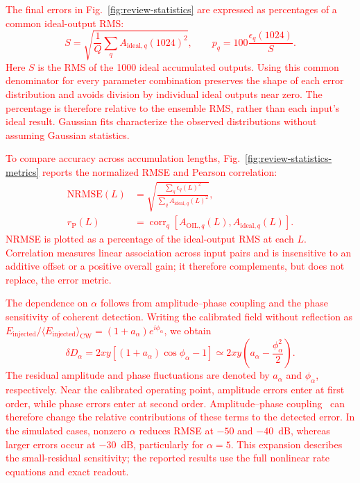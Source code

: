 \documentclass[
 aip,
 apl,
 amsmath,amssymb,
 preprint,
 floatfix,
]{revtex4-1}
\begin{document}
\textcolor{red}{The final errors in Fig.~\ref{fig:review-statistics} are expressed as percentages of a common ideal-output RMS:
\begin{equation}
S=\sqrt{\frac{1}{Q}\sum_q A_{\mathrm{ideal},q}(1024)^2},
\qquad p_q=100\frac{\epsilon_q(1024)}{S}.
\label{eq:final-error-normalization}
\end{equation}
Here $S$ is the RMS of the 1000 ideal accumulated outputs. Using this common denominator for every parameter combination preserves the shape of each error distribution and avoids division by individual ideal outputs near zero. The percentage is therefore relative to the ensemble RMS, rather than each input's ideal result. Gaussian fits characterize the observed distributions without assuming Gaussian statistics.}

\textcolor{red}{To compare accuracy across accumulation lengths, Fig.~\ref{fig:review-statistics-metrics} reports the normalized RMSE and Pearson correlation:
\begin{equation}
\begin{aligned}
\mathrm{NRMSE}(L)&=\sqrt{\frac{\sum_q\epsilon_q(L)^2}{\sum_q A_{\mathrm{ideal},q}(L)^2}},\\
r_{\mathrm P}(L)&=\operatorname{corr}_q[A_{\mathrm{OIL},q}(L),A_{\mathrm{ideal},q}(L)].
\end{aligned}
\end{equation}
NRMSE is plotted as a percentage of the ideal-output RMS at each $L$. Correlation measures linear association across input pairs and is insensitive to an additive offset or a positive overall gain; it therefore complements, but does not replace, the error metric.}

\textcolor{red}{The dependence on $\alpha$ follows from amplitude--phase coupling and the phase sensitivity of coherent detection. Writing the calibrated field without reflection as $E_{\mathrm{injected}}/\langle E_{\mathrm{injected}}\rangle_{\mathrm{CW}}=(1+a_\alpha)e^{i\phi_\alpha}$, we obtain
\begin{equation}
\delta D_\alpha=2xy[(1+a_\alpha)\cos\phi_\alpha-1]
\simeq 2xy\left(a_\alpha-\frac{\phi_\alpha^2}{2}\right).
\end{equation}
The residual amplitude and phase fluctuations are denoted by $a_\alpha$ and $\phi_\alpha$, respectively. Near the calibrated operating point, amplitude errors enter at first order, while phase errors enter at second order. Amplitude--phase coupling~\cite{Lau2009InjectionTutorial} can therefore change the relative contributions of these terms to the detected error. In the simulated cases, nonzero $\alpha$ reduces RMSE at $-50$ and $-40$~dB, whereas larger errors occur at $-30$~dB, particularly for $\alpha=5$. This expansion describes the small-residual sensitivity; the reported results use the full nonlinear rate equations and exact readout.}
\end{document}
